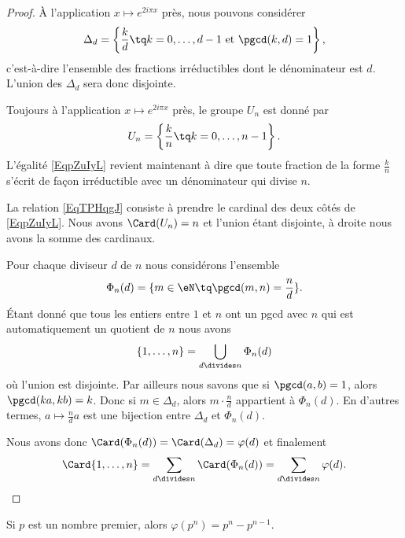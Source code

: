 \begin{proof}
	À l'application \( x\mapsto  e^{2i\pi x}\) près, nous pouvons considérer
	\begin{equation}
		\Delta_d=\left\{ \frac{ k }{ d }\tq k=0,\ldots, d-1 \text{ et } \pgcd(k,d)=1 \right\},
	\end{equation}
	c'est-à-dire l'ensemble des fractions irréductibles dont le dénominateur est \( d\). L'union des \( \Delta_d\) sera donc disjointe.

	Toujours à l'application \( x\mapsto  e^{2i\pi x}\) près, le groupe \( U_n\) est donné par
	\begin{equation}
		U_n=\left\{ \frac{ k }{ n }\tq k=0,\ldots, n-1 \right\}.
	\end{equation}
	L'égalité \eqref{EqpZuIyL} revient maintenant à dire que toute fraction de la forme \( \frac{ k }{ n }\) s'écrit de façon irréductible avec un dénominateur qui divise \( n\).

	La relation \eqref{EqTPHqgJ} consiste à prendre le cardinal des deux côtés de \eqref{EqpZuIyL}. Nous avons \( \Card(U_n)=n\) et l'union étant disjointe, à droite nous avons la somme des cardinaux.

	Pour chaque diviseur \( d\) de \( n\) nous considérons l'ensemble
	\begin{equation}
		\Phi_n(d)=\{ m\in \eN\tq \pgcd(m,n)=\frac{ n }{ d } \}.
	\end{equation}
	Étant donné que tous les entiers entre \( 1\) et \( n\) ont un pgcd avec \( n\) qui est automatiquement un quotient de \( n\) nous avons
	\begin{equation}
		\{ 1,\ldots, n \}=\bigcup_{d\divides n}\Phi_n(d)
	\end{equation}
	où l'union est disjointe. Par ailleurs nous savons que si \( \pgcd(a,b)=1\), alors \( \pgcd(ka,kb)=k\). Donc si \( m\in \Delta_d\), alors \( m\cdot \frac{ n }{ d }\) appartient à \( \Phi_n(d)\). En d'autres termes, \( a\mapsto \frac{ n }{ d }a\) est une bijection entre \( \Delta_d\) et \( \Phi_n(d)\).

	Nous avons donc \( \Card(\Phi_n(d))=\Card(\Delta_d)=\varphi(d)\) et finalement
	\begin{equation}
		\Card\{ 1,\ldots, n \}=\sum_{d\divides n}\Card(\Phi_n(d))=\sum_{d\divides n}\varphi(d).
	\end{equation}
\end{proof}

\begin{lemma}       \label{LEMooBEJOooDqTirj}
	Si \( p\) est un nombre premier, alors \( \varphi(p^n)=p^n-p^{n-1}\).
\end{lemma}

